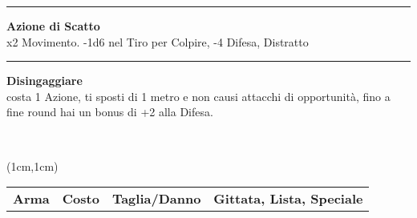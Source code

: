 \documentclass[a4paper,12 pt,openany]{book}
\newcommand{\riga}{\rule{\textwidth}{0.4pt}}
\begin{document}
\begin{textblock*}{6.2cm}
\riga

\textbf{Azione di Scatto}\\
x2 Movimento. -1d6 nel Tiro per Colpire, -4 Difesa, Distratto

\riga

\textbf{Disingaggiare}\\
costa 1 Azione, ti sposti di 1 metro e non causi attacchi di opportunità, fino a fine round hai un bonus di +2 alla Difesa.

\end{textblock*}

~\newpage

\begin{textblock*}{19.5cm}(1cm,1cm) %

\begin{tabularx}{0.95\textwidth}{llll}
\textbf{Arma}&\textbf{Costo}&\textbf{Taglia/Danno} & \textbf{Gittata, Lista, Speciale}\\


\end{tabularx}
\end{textblock*}
\end{document}

